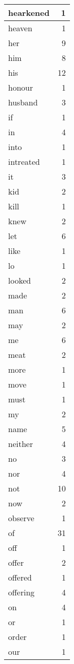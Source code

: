 \begin{center}
\begin{longtable}{l|r}
hearkened & 1\\ \hline 
heaven & 1\\ \hline 
her & 9\\ \hline 
him & 8\\ \hline 
his & 12\\ \hline 
honour & 1\\ \hline 
husband & 3\\ \hline 
if & 1\\ \hline 
in & 4\\ \hline 
into & 1\\ \hline 
intreated & 1\\ \hline 
it & 3\\ \hline 
kid & 2\\ \hline 
kill & 1\\ \hline 
knew & 2\\ \hline 
let & 6\\ \hline 
like & 1\\ \hline 
lo & 1\\ \hline 
looked & 2\\ \hline 
made & 2\\ \hline 
man & 6\\ \hline 
may & 2\\ \hline 
me & 6\\ \hline 
meat & 2\\ \hline 
more & 1\\ \hline 
move & 1\\ \hline 
must & 1\\ \hline 
my & 2\\ \hline 
name & 5\\ \hline 
neither & 4\\ \hline 
no & 3\\ \hline 
nor & 4\\ \hline 
not & 10\\ \hline 
now & 2\\ \hline 
observe & 1\\ \hline 
of & 31\\ \hline 
off & 1\\ \hline 
offer & 2\\ \hline 
offered & 1\\ \hline 
offering & 4\\ \hline 
on & 4\\ \hline 
or & 1\\ \hline 
order & 1\\ \hline 
our & 1\\ \hline 

\end{longtable}
\end{center}
